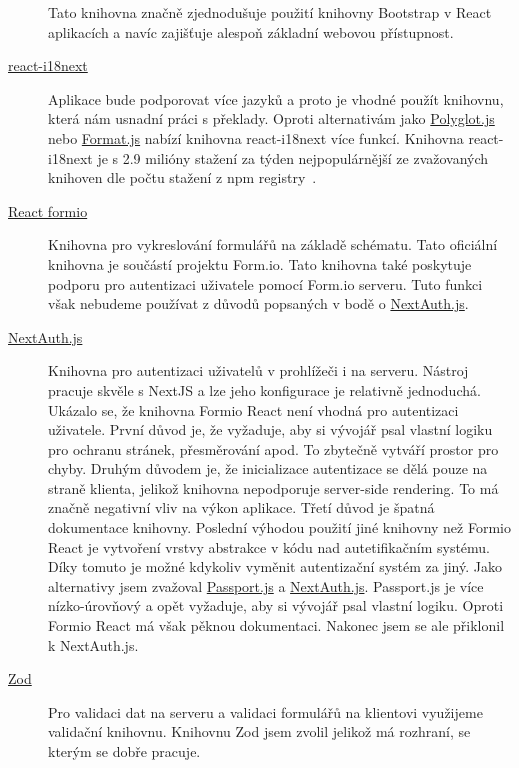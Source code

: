 \begin{description}
    Tato knihovna značně zjednodušuje použití knihovny Bootstrap v React aplikacích a navíc zajišťuje alespoň základní webovou přístupnost.
    \item[\href{https://www.npmjs.com/package/react-i18next}{react-i18next}]
    Aplikace bude podporovat více jazyků a proto je vhodné použít knihovnu, která nám usnadní práci s překlady.
    Oproti alternativám jako \href{https://github.com/airbnb/polyglot.js}{Polyglot.js} nebo \href{https://github.com/formatjs/formatjs}{Format.js} nabízí knihovna react-i18next více funkcí.
    Knihovna react-i18next je s 2.9 milióny stažení za týden nejpopulárnější ze zvažovaných knihoven dle počtu stažení z npm registry~\cite{react-i18next-npm}.
    \item[\href{https://github.com/formio/react}{React formio}]
    Knihovna pro vykreslování formulářů na základě schématu.
    Tato oficiální knihovna je součástí projektu Form.io.
    Tato knihovna také poskytuje podporu pro autentizaci uživatele pomocí Form.io serveru.
    Tuto funkci však nebudeme používat z důvodů popsaných v bodě o \href{itm:next-auth}{NextAuth.js}.
    \item[\href{https://next-auth.js.org/}{NextAuth.js}]\label{itm:next-auth}
    Knihovna pro autentizaci uživatelů v prohlížeči i na serveru.
    Nástroj pracuje skvěle s NextJS a lze jeho konfigurace je relativně jednoduchá.
    Ukázalo se, že knihovna Formio React není vhodná pro autentizaci uživatele.
    První důvod je, že vyžaduje, aby si vývojář psal vlastní logiku pro ochranu stránek, přesměrování apod.
    To zbytečně vytváří prostor pro chyby.
    Druhým důvodem je, že inicializace autentizace se dělá pouze na straně klienta, jelikož knihovna nepodporuje server-side rendering.
    To má značně negativní vliv na výkon aplikace.
    Třetí důvod je špatná dokumentace knihovny.
    Poslední výhodou použití jiné knihovny než Formio React je vytvoření vrstvy abstrakce v kódu nad autetifikačním systému.
    Díky tomuto je možné kdykoliv vyměnit autentizační systém za jiný.
    Jako alternativy jsem zvažoval \href{https://www.passportjs.org/}{Passport.js} a \href{https://next-auth.js.org/}{NextAuth.js}.
    Passport.js je více nízko-úrovňový a opět vyžaduje, aby si vývojář psal vlastní logiku.
    Oproti Formio React má však pěknou dokumentaci.
    Nakonec jsem se ale přiklonil k NextAuth.js.
    \item[\href{https://zod.dev/}{Zod}]
    Pro validaci dat na serveru a validaci formulářů na klientovi využijeme validační knihovnu.
    Knihovnu Zod jsem zvolil jelikož má rozhraní, se kterým se dobře pracuje.

\end{description}

